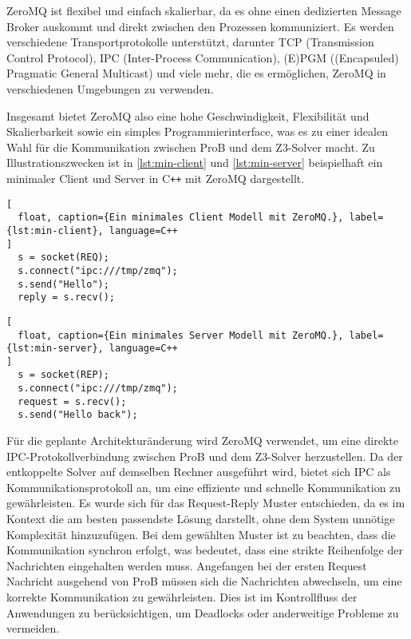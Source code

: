 ZeroMQ ist flexibel und einfach skalierbar, da es ohne einen dedizierten Message Broker auskommt und direkt zwischen den Prozessen kommuniziert.
Es werden verschiedene Transportprotokolle unterstützt, darunter TCP (Transmission Control Protocol), IPC (Inter-Process Communication), (E)PGM ((Encapsuled) Pragmatic General Multicast) und viele mehr, die es ermöglichen, ZeroMQ in verschiedenen Umgebungen zu verwenden.

Insgesamt bietet ZeroMQ also eine hohe Geschwindigkeit, Flexibilität und Skalierbarkeit sowie ein simples Programmierinterface,
was es zu einer idealen Wahl für die Kommunikation zwischen ProB und dem Z3-Solver macht.
Zu Illustrationszwecken ist in \cref{lst:min-client} und \cref{lst:min-server}  beispielhaft ein minimaler Client und Server in C\texttt{++} mit ZeroMQ dargestellt.

\begin{lstlisting}[
  float, caption={Ein minimales Client Modell mit ZeroMQ.}, label={lst:min-client}, language=C++
]
  s = socket(REQ);
  s.connect("ipc:///tmp/zmq");
  s.send("Hello");
  reply = s.recv();
\end{lstlisting}

\begin{lstlisting}[
  float, caption={Ein minimales Server Modell mit ZeroMQ.}, label={lst:min-server}, language=C++
]
  s = socket(REP);
  s.connect("ipc:///tmp/zmq");
  request = s.recv();
  s.send("Hello back");
\end{lstlisting}
\FloatBarrier

Für die geplante Architekturänderung wird ZeroMQ verwendet, um eine direkte IPC-Protokollverbindung zwischen ProB und dem Z3-Solver herzustellen.
Da der entkoppelte Solver auf demselben Rechner ausgeführt wird, bietet sich IPC als Kommunikationsprotokoll an, um eine effiziente und schnelle Kommunikation zu gewährleisten.
Es wurde sich für das Request-Reply Muster entschieden, da es im Kontext die am besten passendste Lösung darstellt,
ohne dem System unnötige Komplexität hinzuzufügen.
Bei dem gewählten Muster ist zu beachten, dass die Kommunikation synchron erfolgt, was bedeutet, dass eine strikte Reihenfolge der Nachrichten eingehalten werden muss.
Angefangen bei der ersten Request Nachricht ausgehend von ProB müssen sich die Nachrichten abwechseln, um eine korrekte Kommunikation zu gewährleisten.
Dies ist im Kontrollfluss der Anwendungen zu berücksichtigen, um Deadlocks oder anderweitige Probleme zu vermeiden.
